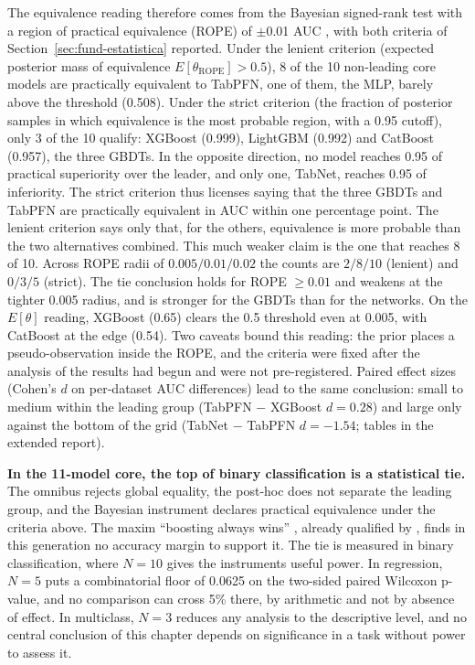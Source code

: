 The equivalence reading therefore comes from the Bayesian signed-rank
test with a region of practical equivalence (ROPE) of $\pm$0.01 AUC
\citep{benavoli2017}, with both criteria of
Section~\ref{sec:fund-estatistica} reported. Under the lenient criterion (expected posterior mass of
equivalence $E[\theta_{\mathrm{ROPE}}] > 0.5$), 8 of the 10 non-leading
core models are practically equivalent to TabPFN, one of them, the
MLP, barely above the threshold (0.508). Under the strict criterion (the
fraction of posterior samples in which equivalence is the most
probable region, with a 0.95 cutoff), only 3 of the 10
qualify: XGBoost (0.999), LightGBM (0.992) and CatBoost (0.957), the three GBDTs. In the opposite direction, no model reaches 0.95
of practical superiority over the leader, and only one, TabNet,
reaches 0.95 of inferiority. The strict criterion thus licenses saying
that the three GBDTs and TabPFN are practically equivalent in AUC
within one percentage point. The lenient criterion says only that, for
the others, equivalence is more probable than the two alternatives
combined. This much weaker claim is the one that reaches
8 of 10. Across ROPE radii of $0.005/0.01/0.02$ the counts are
$2/8/10$ (lenient) and $0/3/5$ (strict). The tie conclusion
holds for ROPE $\geq 0.01$ and weakens at the tighter 0.005 radius,
and is stronger for the GBDTs than for the networks. On the
$E[\theta]$ reading, XGBoost (0.65) clears the 0.5 threshold even at
0.005, with CatBoost at the edge (0.54). Two caveats bound this
reading: the prior places a pseudo-observation inside the ROPE,
and the criteria were fixed after the analysis of the results had
begun and were not pre-registered. Paired effect sizes (Cohen's $d$ on
per-dataset AUC differences) lead to the same conclusion:
small to medium within the leading group (TabPFN $-$ XGBoost
$d{=}0.28$) and large only against the bottom of the grid (TabNet $-$
TabPFN $d{=}{-}1.54$; tables in the extended report).

\textbf{In the 11-model core, the top of binary classification is a
statistical tie.} The omnibus rejects global equality, the
post-hoc does not separate the leading group, and the Bayesian
instrument declares practical equivalence under the criteria above.
The maxim ``boosting always wins'' \citep{grinsztajn2022}, already
qualified by \citet{mcelfresh2023}, finds in this generation no
accuracy margin to support it. The tie is measured in binary
classification, where $N{=}10$ gives the instruments useful power. In
regression, $N{=}5$ puts a combinatorial floor of 0.0625 on the
two-sided paired Wilcoxon p-value, and no comparison can cross 5\% there,
by arithmetic and not by absence of effect. In
multiclass, $N{=}3$ reduces any analysis to the descriptive level, and no
central conclusion of this chapter depends on significance in a task
without power to assess it.

